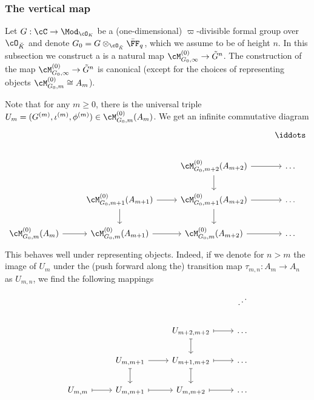 \documentclass[../main.tex]{subfiles}
\begin{document}
\color{black}

\subsubsection{The vertical map} %
\label{sub:The vertical map}
Let $G: \cC \to \Mod_{\cO_K}$ be a (one-dimensional) $\varpi$-divisible formal group over
$\cO_{\breve K}$ and denote $G_0 = G \otimes_{\cO_{\breve K}} \bar \FF_q$,
which we assume to be of height $n$. In this subsection we construct a is a
natural map $\cM^{(0)}_{G_0, \infty} \to \tilde G^n$. The construction of the
map $\cM_{G_0, \infty}^{(0)} \to \tilde G^n$ is canonical (except for the
choices of representing objects $\cM_{G_0,m}^{(0)} \cong A_m$).

Note that for any $m \geq 0$, there is the universal triple $U_m = (G^{(m)},
\iota^{(m)}, \phi^{(m)}) \in \cM^{(0)}_{G_0, m}(A_m)$. We get an infinite
commutative diagram
\[\begin{tikzcd}[ampersand replacement=\&]
	\&\&\& \iddots \\
	\&\& {\cM_{G_0,{m+2}}^{(0)}(A_{m+2})} \& \dots \\
	\& {\cM_{G_0,{m+1}}^{(0)}(A_{m+1})} \& {\cM_{G_0,{m+1}}^{(0)}(A_{m+2})} \& \dots \\
	{\cM_{G_0,m}^{(0)}(A_m)} \& {\cM_{G_0,m}^{(0)}(A_{m+1})} \& {\cM_{G_0,{m}}^{(0)}(A_{m+2})} \& \dots
	\arrow[from=4-1, to=4-2]
	\arrow[from=4-2, to=4-3]
	\arrow[from=3-2, to=3-3]
	\arrow[from=3-2, to=4-2]
	\arrow[from=3-3, to=4-3]
	\arrow[from=2-3, to=3-3]
	\arrow[from=4-3, to=4-4]
	\arrow[from=3-3, to=3-4]
	\arrow[from=2-3, to=2-4]
\end{tikzcd}\]
This behaves well under representing objects. Indeed, if we denote for $n > m$ the image
of $U_m$ under the (push forward along the) transition map $\tau_{m,n}:A_m \to A_n$ as
$U_{m,n}$, we find the following mappings
\[\begin{tikzcd}[ampersand replacement=\&]
	\&\&\& \iddots \\
	\&\& {U_{m+2,m+2}} \& \dots \\
	\& {U_{m,m+1}} \& {U_{m+1,m+2}} \& \dots \\
	{U_{m,m}} \& {U_{m,m+1}} \& {U_{m,m+2}} \& \dots
	\arrow[maps to, from=4-1, to=4-2]
	\arrow[from=3-2, to=3-3]
	\arrow[maps to, from=3-2, to=4-2]
	\arrow[maps to, from=3-3, to=4-3]
	\arrow[maps to, from=2-3, to=3-3]
	\arrow[maps to, from=4-3, to=4-4]
	\arrow[maps to, from=3-3, to=3-4]
	\arrow[maps to, from=2-3, to=2-4]
	\arrow[maps to, from=4-2, to=4-3]
\end{tikzcd}\]
\end{document}
